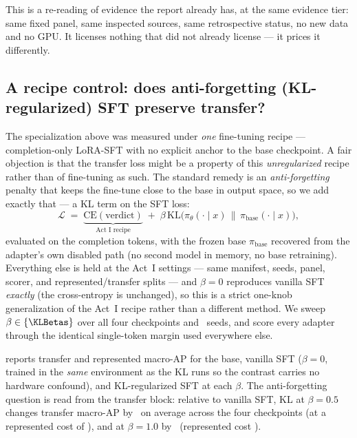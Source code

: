 \noindent This is a re-reading of evidence the report already has, at the same evidence tier: same
fixed panel, same inspected sources, same retrospective status, no new data and no GPU. It licenses
nothing that  did not already license --- it prices it differently.

\subsection{A recipe control: does anti-forgetting (KL-regularized) SFT preserve transfer?}
\label{sec:actI-klsft}

The specialization above was measured under \emph{one} fine-tuning recipe --- completion-only LoRA-SFT with
no explicit anchor to the base checkpoint. A fair objection is that the transfer loss might be a property of
this \emph{unregularized} recipe rather than of fine-tuning as such. The standard remedy is an
\emph{anti-forgetting} penalty that keeps the fine-tune close to the base in output space, so we add exactly
that --- a KL term on the SFT loss:
\begin{equation}
\mathcal{L} \;=\; \underbrace{\mathrm{CE}(\text{verdict})}_{\text{Act~I recipe}} \;+\;
\beta\,\mathrm{KL}\!\big(\pi_\theta(\cdot\mid x)\,\big\|\,\pi_{\text{base}}(\cdot\mid x)\big),
\label{eq:klsft}
\end{equation}
evaluated on the completion tokens, with the frozen base $\pi_{\text{base}}$ recovered from the adapter's own
disabled path (no second model in memory, no base retraining). Everything else is held at the Act~I settings
--- same manifest, seeds, panel, scorer, and represented/transfer splits --- and $\beta=0$ reproduces vanilla
SFT \emph{exactly} (the cross-entropy is unchanged), so this is a strict one-knob generalization of the Act~I
recipe rather than a different method. We sweep $\beta\in\{\KLBetas\}$ over all four checkpoints and
\KLNSeeds\ seeds, and score every adapter through the identical single-token margin used everywhere else.



 reports transfer and represented macro-AP for the base, vanilla SFT ($\beta=0$, trained in
the \emph{same} environment as the KL runs so the contrast carries no hardware confound), and
KL-regularized SFT at each $\beta$. The anti-forgetting question is read from the transfer block: relative to
vanilla SFT, KL at $\beta=0.5$ changes transfer macro-AP by \KLBetaHalfTransferDelta\ on average across the
four checkpoints (at a represented cost of \KLBetaHalfRepDelta), and at $\beta=1.0$ by
\KLBetaOneTransferDelta\ (represented cost \KLBetaOneRepDelta). \KLVerdictSentence

